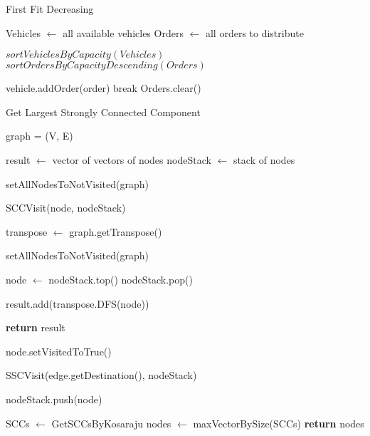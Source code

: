 \documentclass{article}
\begin{document}
\begin{algorithm}[h]
\caption{First Fit Decreasing}
\begin{algorithmic}[1]

\State Vehicles $\gets$ all available vehicles
\State Orders $\gets$ all orders to distribute


\State $sortVehiclesByCapacity(Vehicles)$
\State $sortOrdersByCapacityDescending(Orders)$

			\State vehicle.addOrder(order)
			\State break
		\EndIf
	\EndFor
\EndFor
\State Orders.clear()
\EndProcedure

\end{algorithmic}
\end{algorithm}

\begin{algorithm}[h]
\caption{Get Largest Strongly Connected Component}
\begin{algorithmic}[1]

\State graph = (V, E)


\State result $\gets$ vector of vectors of nodes
\State nodeStack $\gets$ stack of nodes

\State setAllNodesToNotVisited(graph)

	\State SCCVisit(node, nodeStack)
\EndFor

\State transpose $\gets$ graph.getTranspose()

\State setAllNodesToNotVisited(graph)

	\State node $\gets$ nodeStack.top()
	\State nodeStack.pop()

		\State result.add(transpose.DFS(node))
	\EndIf
\EndWhile

\State \textbf{return} result
\EndProcedure

\State

	\State node.setVisitedToTrue()

			\State SSCVisit(edge.getDestination(), nodeStack)
		\EndIf
	\EndFor

	\State nodeStack.push(node)
\EndProcedure

\State

	\State SCCs $\gets$ GetSCCsByKosaraju
	\State nodes $\gets$ maxVectorBySize(SCCs)
	\State \textbf{return} nodes
\EndProcedure

\end{algorithmic}
\end{algorithm}
\end{document}
